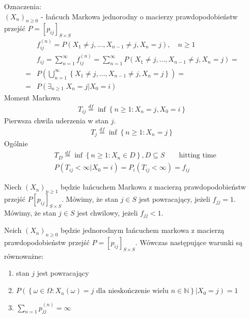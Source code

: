 Oznaczenia:\\
$ \left(X_n\right)_{n\ge0} $ - łańcuch Markowa jednorodny o macierzy prawdopodobieństw przejść $ P=\left[p_{ij}\right] _{S\times S}$
\begin{align*}
&f_{ij}^{(n)}=P\left(X_1\neq j,\dots,X_{n-1}\neq j,X_n=j\right),\quad n\ge 1\\
&f_{ij}=\sum_{n=1}^{\infty }f_{ij}^{(n)}=
\sum_{n=1}^{\infty }P\left(X_1\neq j,\dots,X_{n-1}\neq j,X_n=j\right)
=\\=
&P\left(\bigcup_{n=1}^{\infty }\left\{X_1\neq j,\dots,X_{n-1}\neq j,X_n=j\right\}\right)
=\\=
&P\left(\exists_{n\ge 1}\;X_n=j|X_0=i\right)
\end{align*}
Moment Markowa
\begin{gather*}
T_{ij}\stackrel{df}{=}\inf\left\{n\ge1:X_n=j,X_0=i \right\}
\end{gather*}
Pierwsza chwila uderzenia w stan $ j $.
\begin{gather*}
T_j\stackrel{df}{=}\inf\left\{n\ge1:X_n=j\right\}
\end{gather*}
Ogólnie
\begin{align*}
&T_D\stackrel{df}{=}\inf \left\{n\ge1:X_n\in D\right\},D\subseteq S\qquad\text{hitting time}\\
&P\left(T_{ij}<\infty |X_0=i\right)=P_i\left(T_{ij}<\infty \right)=f_{ij}
\end{align*}
\begin{defi}
Niech $ \left(X_n\right)_{n\ge 1} $ będzie łańcuchem Markowa z macierzą prawdopodobieństw przejść $ P\left[p_{ij}\right]_{S\times S} $. Mówimy, że stan $ j\in S $ jest powracający, jeżeli $ f_{jj}=1 $.\\
Mówimy, że stan $ j\in S $ jest chwilowy, jeżeli $ f_{jj}<1 $.
\end{defi}
\begin{twr}Neich $ \left(X_n\right)_{n\ge0} $ będzie jednorodnym łańcuchem markowa z macierzą prawdopodobieństw przejść $ P=\left[p_{ij}\right] _{S\times S}$. Wówczas następujące warunki są równoważne:
\begin{enumerate}
\item stan $ j $ jest powracający
\item $ P\left(\left\{\omega\in\Omega:X_n(\omega)=j\text{ dla nieskończenie wielu }n\in \mathbb N \right\}|X_0=j\right)=1 $
\item $ \sum_{n=1}^{}p_{jj}^{(n)}=\infty $
\end{enumerate}
\end{twr}
